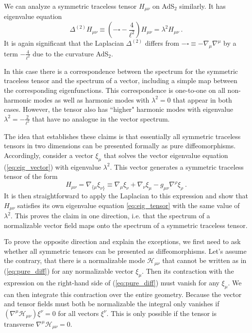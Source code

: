 \documentclass[12pt]{article}
\begin{document}
We can analyze a symmetric traceless tensor $H_{\mu\nu}$ on AdS$_2$ similarly. It has eigenvalue equation
%
\begin{equation}
	\Delta^{(2)} H_{\mu\nu} \equiv \left(-\square - \frac{4}{\ell^2}\right) H_{\mu\nu} = \lambda^2 H_{\mu\nu}~.
\label{eq:eig_tensor}
\end{equation}
%
It is again significant that the Laplacian $\Delta^{(2)}$ differs from $-\square \equiv - \nabla_\mu \nabla^\mu$ by a term $-\frac{4}{\ell^2}$ due to the curvature AdS$_2$.

In this case there is a correspondence between the spectrum for the symmetric traceless tensor and the spectrum of a vector, including a simple map between the corresponding eigenfunctions.  This correspondence is one-to-one on all non-harmonic modes as well as harmonic modes with $\lambda^2 = 0$ that appear in both cases.  However, the tensor also has ``higher" harmonic modes with eigenvalue $\lambda^2 = - \frac{2}{\ell^2}$ that have no analogue in the vector spectrum.

The idea that establishes these claims is that essentially all symmetric traceless tensors in two dimensions can be presented formally as pure diffeomorphisms.  Accordingly, consider a vector $\xi_\mu$ that solves the vector eigenvalue equation (\ref{eq:eig_vector}) with eigenvalue $\lambda^2$.  This vector generates a symmetric traceless tensor of the form
\begin{equation}
	H_{\mu\nu} = \nabla_{\{\mu} \xi_{\nu\}} \equiv \nabla_\mu \xi_\nu + \nabla_\nu \xi_\mu - g_{\mu\nu} \nabla^\rho \xi_\rho~.
\label{eq:pure_diff}
\end{equation}
It is then straightforward to apply the Laplacian to this expression and show that $H_{\mu\nu}$ satisfies its own eigenvalue equation \eqref{eq:eig_tensor} with the same value of $\lambda^2$. This proves the claim in one direction, i.e. that the spectrum of a normalizable vector field maps onto the spectrum of a symmetric traceless tensor.

To prove the opposite direction and explain the exceptions, we first need to ask whether all symmetric tensors can be presented as diffeomorphisms.  Let's assume the contrary, that there is a normalizable mode $\mathcal{H}_{\mu\nu}$ that cannot be written as in (\ref{eq:pure_diff}) for any normalizable vector $\xi_\mu$.  Then its contraction with the expression on the right-hand side of (\ref{eq:pure_diff}) must vanish for any $\xi_\mu$.  We can then integrate this contraction over the entire geometry. Because the vector and tensor fields must both be normalizable the integral only vanishes if $(\nabla^\mu \mathcal{H}_{\mu\nu})\xi^\nu = 0$ for all vectors $\xi^\nu$.  This is only possible if the tensor is transverse $\nabla^\mu \mathcal{H}_{\mu\nu} = 0$.
\end{document}

